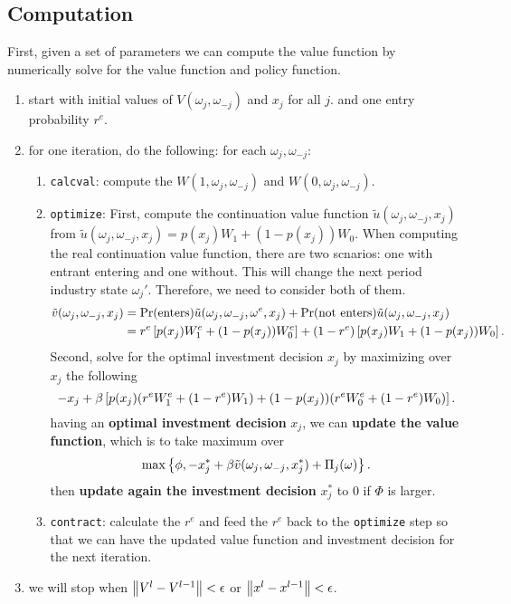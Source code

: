 \documentclass[12pt]{article}[margin=1in]
\begin{document}
\subsection{Computation}
First, given a set of parameters we can compute the value function by numerically solve for the value function and policy function.
\begin{enumerate}
    \item start with initial values of $V(\omega_j, \omega_{-j})$ and $x_j$ for all $j$. and one entry probability $r^e$.
    \item for one iteration, do the following:
    for each $\omega_j, \omega_{-j}$:
    \begin{enumerate}
        \item \verb|calcval|: compute the $W(1, \omega_j,\omega_{-j})$ and $W(0, \omega_j,\omega_{-j})$.
        \item  \verb|optimize|: First, compute the continuation value function $\tilde{u}(\omega_j, \omega_{-j}, x_j)$ from $\tilde{u}(\omega_j, \omega_{-j}, x_j)= p(x_j)W_1+(1-p(x_j))W_0$. When computing the real continuation value function, there are two scnarios: one with entrant entering and one without. This will change the next period industry state $\omega_j'$. Therefore, we need to consider both of them.
        \begin{equation*}
            \begin{split}
                \tilde{v}(\omega_j, \omega_{-j}, x_j)&=\Pr(\text{enters})\tilde{u}(\omega_j, \omega_{-j}, \omega^e, x_j)
                +\Pr(\text{not enters})\tilde{u}(\omega_j, \omega_{-j}, x_j)\\
                & = r^e\left[p(x_j)W_1^e+(1-p(x_j))W_0^e\right]+(1-r^e)\left[p(x_j)W_1+(1-p(x_j))W_0\right].
            \end{split}
        \end{equation*}
        Second, solve for the optimal investment decision $x_j$ by maximizing over $x_j$ the following
        \begin{equation*}
            -x_j + \beta\left[p(x_j)(r^eW^e_1+(1-r^e)W_1)+(1-p(x_j))(r^eW_0^e+(1-r^e)W_0)\right].
        \end{equation*}
        having an \textbf{optimal investment decision} $x_j$, we can \textbf{update the value function}, which is to take maximum over 
        \begin{equation*}
            \max\left\{\phi, -x_j^*+\beta\tilde{v}(\omega_j, \omega_{-j}, x_j^*)+\Pi_j(\omega)\right\}.
        \end{equation*}
        then \textbf{update again the investment decision} $x_j^*$ to $0$ if $\Phi$ is larger.
        \item \verb|contract|: calculate the $r^e$ and feed the $r^e$ back to the \verb|optimize| step so that we can have the updated value function and investment decision for the next iteration.
    \end{enumerate}
    \item we will stop when $\left\| V^{l}-V^{l-1} \right\|<\epsilon$ or $\left\| x^{l}-x^{l-1} \right\|<\epsilon$.
\end{enumerate}
\end{document}
